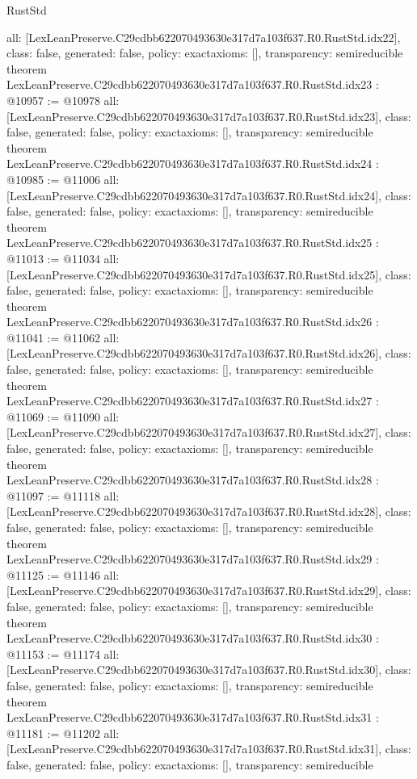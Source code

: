 \begin{lexlean}{RustStd}
\begin{coremodule}
{  all: [LexLeanPreserve.C29cdbb622070493630e317d7a103f637.R0.RustStd.idx22],
  class: false,
  generated: false,
  policy: exact{axioms: []},
  transparency: semireducible
}
theorem LexLeanPreserve.C29cdbb622070493630e317d7a103f637.R0.RustStd.idx23 : @10957 := @10978 {
  all: [LexLeanPreserve.C29cdbb622070493630e317d7a103f637.R0.RustStd.idx23],
  class: false,
  generated: false,
  policy: exact{axioms: []},
  transparency: semireducible
}
theorem LexLeanPreserve.C29cdbb622070493630e317d7a103f637.R0.RustStd.idx24 : @10985 := @11006 {
  all: [LexLeanPreserve.C29cdbb622070493630e317d7a103f637.R0.RustStd.idx24],
  class: false,
  generated: false,
  policy: exact{axioms: []},
  transparency: semireducible
}
theorem LexLeanPreserve.C29cdbb622070493630e317d7a103f637.R0.RustStd.idx25 : @11013 := @11034 {
  all: [LexLeanPreserve.C29cdbb622070493630e317d7a103f637.R0.RustStd.idx25],
  class: false,
  generated: false,
  policy: exact{axioms: []},
  transparency: semireducible
}
theorem LexLeanPreserve.C29cdbb622070493630e317d7a103f637.R0.RustStd.idx26 : @11041 := @11062 {
  all: [LexLeanPreserve.C29cdbb622070493630e317d7a103f637.R0.RustStd.idx26],
  class: false,
  generated: false,
  policy: exact{axioms: []},
  transparency: semireducible
}
theorem LexLeanPreserve.C29cdbb622070493630e317d7a103f637.R0.RustStd.idx27 : @11069 := @11090 {
  all: [LexLeanPreserve.C29cdbb622070493630e317d7a103f637.R0.RustStd.idx27],
  class: false,
  generated: false,
  policy: exact{axioms: []},
  transparency: semireducible
}
theorem LexLeanPreserve.C29cdbb622070493630e317d7a103f637.R0.RustStd.idx28 : @11097 := @11118 {
  all: [LexLeanPreserve.C29cdbb622070493630e317d7a103f637.R0.RustStd.idx28],
  class: false,
  generated: false,
  policy: exact{axioms: []},
  transparency: semireducible
}
theorem LexLeanPreserve.C29cdbb622070493630e317d7a103f637.R0.RustStd.idx29 : @11125 := @11146 {
  all: [LexLeanPreserve.C29cdbb622070493630e317d7a103f637.R0.RustStd.idx29],
  class: false,
  generated: false,
  policy: exact{axioms: []},
  transparency: semireducible
}
theorem LexLeanPreserve.C29cdbb622070493630e317d7a103f637.R0.RustStd.idx30 : @11153 := @11174 {
  all: [LexLeanPreserve.C29cdbb622070493630e317d7a103f637.R0.RustStd.idx30],
  class: false,
  generated: false,
  policy: exact{axioms: []},
  transparency: semireducible
}
theorem LexLeanPreserve.C29cdbb622070493630e317d7a103f637.R0.RustStd.idx31 : @11181 := @11202 {
  all: [LexLeanPreserve.C29cdbb622070493630e317d7a103f637.R0.RustStd.idx31],
  class: false,
  generated: false,
  policy: exact{axioms: []},
  transparency: semireducible
}
\end{coremodule}
\end{lexlean}
